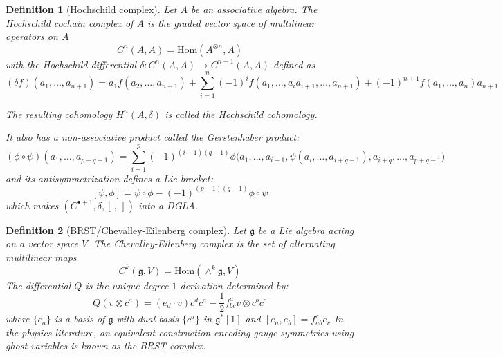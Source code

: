 \documentclass[
  12pt,
  a4paper, oneside
]{report}
\theoremstyle{bolddef}
\newtheorem{definition}{Definition}
\theoremstyle{remark}
\numberwithin{equation}{chapter}
\begin{document}
\begin{definition}[Hochschild complex]\label{def:hochschild}
Let $A$ be an associative algebra. The \emph{Hochschild cochain complex} of $A$ 
is the graded vector space of multilinear operators on $A$ 
$$
C^n(A,A) = \mathrm{Hom}(A^{\otimes n},A)
$$
with the Hochschild differential $\delta : C^n(A,A) \to C^{n+1}(A,A)$ defined as
$$
(\delta f)(a_1,\dots,a_{n+1})
=
a_1 f(a_2,\dots,a_{n+1})
+
\sum_{i=1}^n (-1)^i 
f(a_1,\dots,a_i a_{i+1},\dots,a_{n+1})
+
(-1)^{n+1}
f(a_1,\dots,a_n)a_{n+1}
$$

The resulting cohomology $H^{n}(A,\delta)$ is called the \emph{Hochschild cohomology}.

It also has a non-associative product called the Gerstenhaber product:
$$
(\phi \circ \psi)(a_1,\dots,a_{p+q-1})
=
\sum_{i=1}^{p}
(-1)^{(i-1)(q-1)}
\phi\big(a_1,\dots,a_{i-1},
\psi(a_i,\dots,a_{i+q-1}),
a_{i+q},\dots,a_{p+q-1}\big)
$$
and its antisymmetrization defines a Lie bracket:
$$
[\psi,\phi] = \psi \circ\phi - (-1)^{(p-1)(q-1)}\phi\circ\psi
$$
which makes $(C^{\bullet+1},\delta,[\,,\,])$ into a DGLA. 

\end{definition}


\begin{definition}[BRST/Chevalley-Eilenberg complex]
Let $\mathfrak g$ be a Lie algebra acting on a vector space $V$. 
The \emph{Chevalley-Eilenberg complex} is the set of alternating multilinear maps
$$
C^k(\mathfrak g,V) = \mathrm{Hom}(\wedge^k \mathfrak g, V)
$$
The differential $Q$ is the unique degree $1$ derivation determined by:  
$$ 
Q(v\otimes c^a) = (e_{d}\cdot v)c^dc^a - \frac{1}{2}f^a_{bc}v\otimes c^bc^c 
$$
where $\{e_{a}\}$ is a basis of $\mathfrak{g}$ with dual basis $\{c^a\}$ in $\mathfrak{g}^*[1]$ and $[e_{a},e_{b}] = f^c_{ab}e_{c}$ 
In the physics literature, an equivalent construction encoding gauge symmetries 
using ghost variables is known as the \emph{BRST complex}.
\end{definition}
\end{document}
